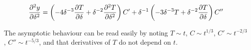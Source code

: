\begin{equation}
	\frac{\partial^2 y}{\partial \delta^2} = 
	\left( -4\delta^{-3} \frac{\partial T}{\partial\delta}  + \delta^{-2}\frac{\partial^2 T}{\partial \delta^2}\right)C'  + \delta^{-1} \left( -3\delta^{-3} T + \delta^{-2} \frac{\partial T}{\partial\delta} \right)C''
	\label{}
\end{equation}

The asymptotic behaviour can be read easily by noting $T \sim t$, $C \sim t^{1/3}$, $C' \sim t^{-2/3}$, $C'' \sim t^{-5/3}$, and that derivatives of $T$ do not depend on $t$.

%
%
%
%
%
%
%
%
%
%

%

